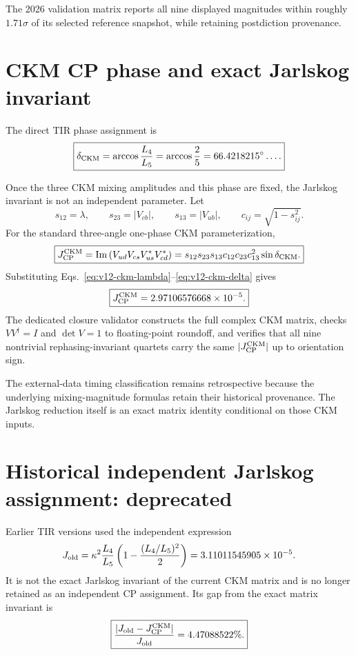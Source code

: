 The 2026 validation matrix reports all nine displayed magnitudes within roughly
$1.71\sigma$ of its selected reference snapshot, while retaining postdiction
provenance.

\section{CKM CP phase and exact Jarlskog invariant}
The direct TIR phase assignment is
\begin{equation}
\boxed{
\delta_{\rm CKM}
=\arccos\frac{L_4}{L_5}
=\arccos\frac25
=66.4218215^\circ\ldots .
}
\label{eq:v12-ckm-delta}
\end{equation}

Once the three CKM mixing amplitudes and this phase are fixed, the Jarlskog
invariant is not an independent parameter.  Let
\begin{equation}
s_{12}=\lambda,
\qquad
s_{23}=|V_{cb}|,
\qquad
s_{13}=|V_{ub}|,
\qquad
c_{ij}=\sqrt{1-s_{ij}^2}.
\label{eq:v12-ckm-sines}
\end{equation}
For the standard three-angle one-phase CKM parameterization,
\begin{equation}
\boxed{
J_{\rm CP}^{\rm CKM}
=\operatorname{Im}
\left(V_{ud}V_{cs}V_{us}^{\ast}V_{cd}^{\ast}\right)
=s_{12}s_{23}s_{13}c_{12}c_{23}c_{13}^{2}\sin\delta_{\rm CKM}.
}
\label{eq:v12-ckm-jarlskog}
\end{equation}
Substituting Eqs.~\eqref{eq:v12-ckm-lambda}--\eqref{eq:v12-ckm-delta}
gives
\begin{equation}
\boxed{
J_{\rm CP}^{\rm CKM}
=2.97106576668\times10^{-5}.
}
\label{eq:v12-ckm-jarlskog-value}
\end{equation}
The dedicated closure validator constructs the full complex CKM matrix,
checks $VV^\dagger=I$ and $\det V=1$ to floating-point roundoff, and verifies
that all nine nontrivial rephasing-invariant quartets carry the same
$|J_{\rm CP}^{\rm CKM}|$ up to orientation sign.

The external-data timing classification remains retrospective because the
underlying mixing-magnitude formulas retain their historical provenance.  The
Jarlskog reduction itself is an exact matrix identity conditional on those CKM
inputs.

\section{Historical independent Jarlskog assignment: deprecated}
Earlier TIR versions used the independent expression
\begin{equation}
J_{\rm old}
=\kappa^2\frac{L_4}{L_5}
\left(1-\frac{(L_4/L_5)^2}{2}\right)
=3.11011545905\times10^{-5}.
\label{eq:v12-ckm-j-old}
\end{equation}
It is not the exact Jarlskog invariant of the current CKM matrix and is no
longer retained as an independent CP assignment.  Its gap from the exact matrix
invariant is
\begin{equation}
\boxed{
\frac{|J_{\rm old}-J_{\rm CP}^{\rm CKM}|}{J_{\rm old}}
=4.47088522\%.
}
\label{eq:v12-ckm-j-old-gap}
\end{equation}


